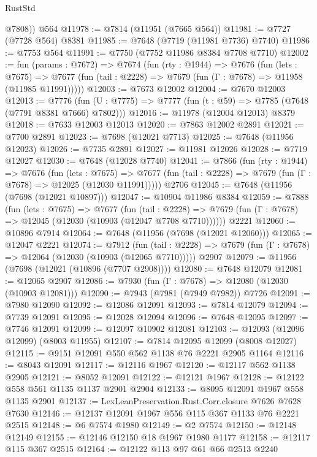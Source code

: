 \begin{lexlean}{RustStd}
\begin{coremodule}
        @7808))
    @564
@11978 := @7814 (@11951 (@7665 @564))
@11981 := @7727 (@7728 @564) @8381
@11985 := @7648 (@7719 (@11981 @7736) @7740)
@11986 := @7753 @564
@11991 := @7750 (@7752 @11986 @8384 @7708 @7710)
@12002 := fun (params : @7672) =>
  @7674
    (fun (rty : @1944) =>
    @7676
      (fun (lets : @7675) =>
      @7677 (fun (tail : @2228) => @7679 (fun (Γ : @7678) => @11958 (@11985 @11991)))))
@12003 := @7673 @12002
@12004 := @7670 @12003
@12013 := @7776
    (fun (U : @7775) => @7777 (fun (t : @59) => @7785 (@7648 (@7791 @8381 @7666) @7802)))
@12016 := @11978 (@12004 @12013) @8379
@12018 := @7633 @12003 @12013
@12020 := @7863 @12002 @2891
@12021 := @7700 @2891
@12023 := @7698 (@12021 @7713)
@12025 := @7648 (@11956 @12023)
@12026 := @7735 @2891
@12027 := @11981 @12026
@12028 := @7719 @12027
@12030 := @7648 (@12028 @7740)
@12041 := @7866
    (fun (rty : @1944) =>
    @7676
      (fun (lets : @7675) =>
      @7677 (fun (tail : @2228) => @7679 (fun (Γ : @7678) => @12025 (@12030 @11991)))))
    @2706
@12045 := @7648 (@11956 (@7698 (@12021 @10897)))
@12047 := @10904 @11986 @8384
@12059 := @7888
    (fun (lets : @7675) =>
    @7677
      (fun (tail : @2228) =>
      @7679 (fun (Γ : @7678) => @12045 (@12030 (@10903 (@12047 @7708 @7710))))))
    @2221
@12060 := @10896 @7914
@12064 := @7648 (@11956 (@7698 (@12021 @12060)))
@12065 := @12047 @2221
@12074 := @7912
    (fun (tail : @2228) => @7679 (fun (Γ : @7678) => @12064 (@12030 (@10903 (@12065 @7710)))))
    @2907
@12079 := @11956 (@7698 (@12021 (@10896 (@7707 @2908))))
@12080 := @7648 @12079
@12081 := @12065 @2907
@12086 := @7930 (fun (Γ : @7678) => @12080 (@12030 (@10903 @12081)))
@12090 := @7943 (@7981 (@7949 @7982)) @7726
@12091 := @7980 @12090
@12092 := @12086 @12091
@12093 := @7814 @12079
@12094 := @7739 @12091
@12095 := @12028 @12094
@12096 := @7648 @12095
@12097 := @7746 @12091
@12099 := @12097 @10902 @12081
@12103 := @12093 (@12096 @12099) (@8003 @11955)
@12107 := @7814 @12095 @12099 (@8008 @12027)
@12115 := @9151 @12091 @550 @562 @1138 @76 @2221 @2905 @1164
@12116 := @8043 @12091
@12117 := @12116 @1967
@12120 := @12117 @562 @1138 @2905
@12121 := @8052 @12091
@12122 := @12121 @1967
@12128 := @12122 @558 @561 @1135 @1137 @2901 @2904
@12133 := @8095 @12091 @1967 @558 @1135 @2901
@12137 := LexLeanPreservation.Rust.Corr.closure @7626 @7628 @7630
@12146 := @12137 @12091 @1967 @556 @115 @367 @1133 @76 @2221 @2515
@12148 := @6 @7574 @1980
@12149 := @2 @7574
@12150 := @12148 @12149
@12155 := @12146 @12150 @18 @1967 @1980 @1177
@12158 := @12117 @115 @367 @2515
@12164 := @12122 @113 @97 @61 @66 @2513 @2240

\end{coremodule}
\end{lexlean}
